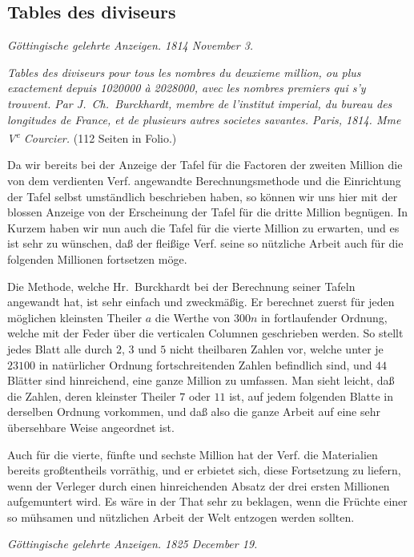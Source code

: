 \documentclass[12pt,a4paper]{article}
\theoremstyle{plain}
\theoremstyle{definition}
\theoremstyle{remark}
\begin{document}
\subsection*{Tables des diviseurs}

\textit{Göttingische gelehrte Anzeigen. 1814 November 3.}

\textit{Tables des diviseurs pour tous les nombres du deuxieme million, ou plus exactement depuis 1020000 à 2028000, avec les nombres premiers qui s'y trouvent. Par J.\ Ch.\ Burckhardt, membre de l'institut imperial, du bureau des longitudes de France, et de plusieurs autres societes savantes. Paris, 1814. Mme V\textsuperscript{e} Courcier.} (112 Seiten in Folio.)

Da wir bereits bei der Anzeige der Tafel für die Factoren der zweiten Million die von dem verdienten Verf. angewandte Berechnungsmethode und die Einrichtung der Tafel selbst umständlich beschrieben haben, so können wir uns hier mit der blossen Anzeige von der Erscheinung der Tafel für die dritte Million begnügen. In Kurzem haben wir nun auch die Tafel für die vierte Million zu erwarten, und es ist sehr zu wünschen, daß der fleißige Verf. seine so nützliche Arbeit auch für die folgenden Millionen fortsetzen möge.

Die Methode, welche Hr.~Burckhardt bei der Berechnung seiner Tafeln angewandt hat, ist sehr einfach und zweckmäßig. Er berechnet zuerst für jeden möglichen kleinsten Theiler $a$ die Werthe von $300n$ in fortlaufender Ordnung, welche mit der Feder über die verticalen Columnen geschrieben werden. So stellt jedes Blatt alle durch $2$, $3$ und $5$ nicht theilbaren Zahlen vor, welche unter je $23100$ in natürlicher Ordnung fortschreitenden Zahlen befindlich sind, und $44$ Blätter sind hinreichend, eine ganze Million zu umfassen. Man sieht leicht, daß die Zahlen, deren kleinster Theiler $7$ oder $11$ ist, auf jedem folgenden Blatte in derselben Ordnung vorkommen, und daß also die ganze Arbeit auf eine sehr übersehbare Weise angeordnet ist.

Auch für die vierte, fünfte und sechste Million hat der Verf. die Materialien bereits großtentheils vorräthig, und er erbietet sich, diese Fortsetzung zu liefern, wenn der Verleger durch einen hinreichenden Absatz der drei ersten Millionen aufgemuntert wird. Es wäre in der That sehr zu beklagen, wenn die Früchte einer so mühsamen und nützlichen Arbeit der Welt entzogen werden sollten.

\textit{Göttingische gelehrte Anzeigen. 1825 December 19.}
\end{document}
